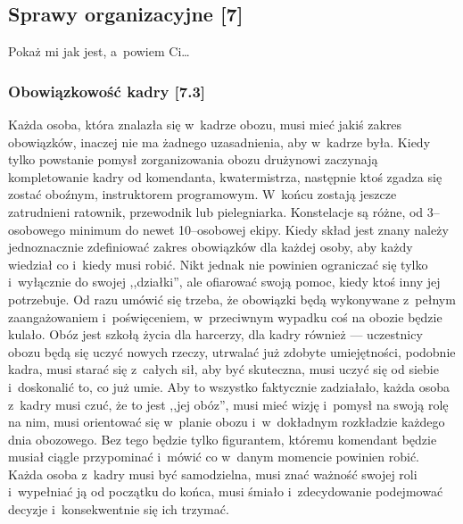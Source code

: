 \documentclass[a5paper,10pt,titlepage,twoside]{article}
\begin{document}
\subsection{Sprawy organizacyjne [7]}
Pokaż mi jak jest, a~powiem Ci\ldots
\subsubsection{Obowiązkowość kadry [7.3]}
Każda osoba, która znalazła się w~kadrze obozu, musi mieć jakiś zakres obowiązków, inaczej nie ma żadnego uzasadnienia, aby w~kadrze była. Kiedy tylko powstanie pomysł zorganizowania obozu drużynowi zaczynają kompletowanie kadry od komendanta, kwatermistrza, następnie ktoś zgadza się zostać oboźnym, instruktorem programowym. W~końcu zostają jeszcze zatrudnieni ratownik, przewodnik lub pielegniarka. Konstelacje są różne, od 3--osobowego minimum do newet 10--osobowej ekipy. Kiedy skład jest znany należy jednoznacznie zdefiniować zakres obowiązków dla każdej osoby, aby każdy wiedział co i~kiedy musi robić. Nikt jednak nie powinien ograniczać się tylko i~wyłącznie do swojej ,,działki'', ale ofiarować swoją pomoc, kiedy ktoś inny jej potrzebuje. Od razu umówić się trzeba, że obowiązki będą wykonywane z~pełnym zaangażowaniem i~poświęceniem, w~przeciwnym wypadku coś na obozie będzie kulało. Obóz jest szkołą życia dla harcerzy, dla kadry również --- uczestnicy obozu będą się uczyć nowych rzeczy, utrwalać już zdobyte umiejętności, podobnie kadra, musi starać się z~całych sił, aby być skuteczna, musi uczyć się od siebie i~doskonalić to, co już umie. Aby to wszystko faktycznie zadziałało, każda osoba z~kadry musi czuć, że to jest ,,jej obóz'', musi mieć wizję i~pomysł na swoją rolę na nim, musi orientować się w~planie obozu i~w~dokładnym rozkładzie każdego dnia obozowego. Bez tego będzie tylko figurantem, któremu komendant będzie musiał ciągle przypominać i~mówić co w~danym momencie powinien robić. Każda osoba z~kadry musi być samodzielna, musi znać ważność swojej roli i~wypełniać ją od początku do końca, musi śmiało i~zdecydowanie podejmować decyzje i~konsekwentnie się ich trzymać.
\end{document}

